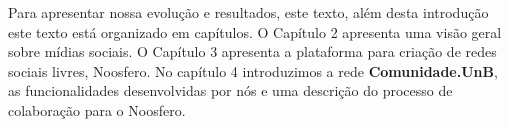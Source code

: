 Para apresentar nossa evolução e resultados, este texto, além desta introdução
este texto está organizado em capítulos. O Capítulo 2 apresenta uma visão geral
sobre mídias sociais. O Capítulo 3 apresenta
a plataforma para criação de redes sociais livres, Noosfero. No capítulo 4
introduzimos a rede \textbf{Comunidade.UnB}, as funcionalidades desenvolvidas por nós e 
uma descrição do processo de colaboração para o Noosfero.
